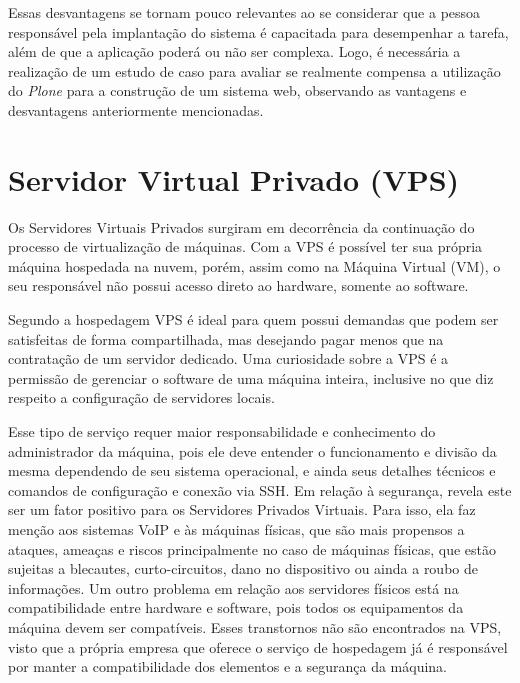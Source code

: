 Essas desvantagens se tornam pouco relevantes ao se considerar que a pessoa responsável pela implantação do sistema é capacitada para desempenhar a tarefa, além de que a aplicação poderá ou não ser complexa. Logo, é necessária a realização de um estudo de caso para avaliar se realmente compensa a utilização do \textit{Plone} para a construção de um sistema web, observando as vantagens e desvantagens anteriormente mencionadas. 

\hspace{2.5cm}

\section{Servidor Virtual Privado (VPS)}
\label{sec:vps}

\hspace{2.5cm}

Os Servidores Virtuais Privados surgiram em decorrência da continuação do processo de virtualização de máquinas. Com a VPS é possível ter sua própria máquina hospedada na nuvem, porém, assim como na Máquina Virtual (VM), o seu responsável não possui acesso direto ao hardware, somente ao software.

Segundo  a hospedagem VPS é ideal para quem possui demandas que podem ser satisfeitas de forma compartilhada, mas desejando pagar menos que na contratação de um servidor dedicado. Uma curiosidade sobre a VPS é a permissão de gerenciar o software de uma máquina inteira, inclusive no que diz respeito a configuração de servidores locais. 

Esse tipo de serviço requer maior responsabilidade e conhecimento do administrador da máquina, pois ele deve entender o funcionamento e divisão da mesma dependendo de seu sistema operacional, e ainda seus detalhes técnicos e comandos de configuração e conexão via SSH. Em relação à segurança, \cite{elizabeth2017diseno} revela este ser um fator positivo para os Servidores Privados Virtuais. Para isso, ela faz menção aos sistemas VoIP e às máquinas físicas, que são mais propensos a ataques, ameaças e riscos principalmente no caso de máquinas físicas, que estão sujeitas a blecautes, curto-circuitos, dano no dispositivo ou ainda a roubo de informações. Um outro problema em relação aos servidores físicos está na compatibilidade entre hardware e software, pois todos os equipamentos da máquina devem ser compatíveis. Esses transtornos não são encontrados na VPS, visto que a própria empresa que oferece o serviço de hospedagem já é responsável por manter a compatibilidade dos elementos e a segurança da máquina.  

